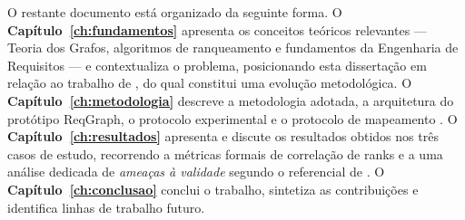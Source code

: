 O restante documento está organizado da seguinte forma. O
\textbf{Capítulo~\ref{ch:fundamentos}} apresenta os conceitos teóricos
relevantes --- Teoria dos Grafos, algoritmos de ranqueamento e
fundamentos da Engenharia de Requisitos --- e contextualiza o
problema, posicionando esta dissertação em relação ao trabalho de
\citet{silva2018}, do qual constitui uma evolução metodológica. O
\textbf{Capítulo~\ref{ch:metodologia}} descreve a metodologia
adotada, a arquitetura do protótipo ReqGraph, o protocolo experimental
e o protocolo de mapeamento . O
\textbf{Capítulo~\ref{ch:resultados}} apresenta e discute os
resultados obtidos nos três casos de estudo, recorrendo a métricas
formais de correlação de ranks e a uma análise dedicada de
\emph{ameaças à validade} segundo o referencial de
\citet{wohlin2012}. O \textbf{Capítulo~\ref{ch:conclusao}} conclui o
trabalho, sintetiza as contribuições e identifica linhas de trabalho
futuro.

